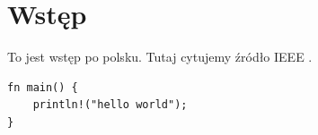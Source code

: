 \chapter{Wstęp}
To jest wstęp po polsku. Tutaj cytujemy źródło IEEE \cite{example2026}.

\begin{listing}[ht]
\begin{verbatim}
fn main() {
    println!("hello world");
}
\end{verbatim}
\caption{Przykładowy kod w języku Rust}
\end{listing}
